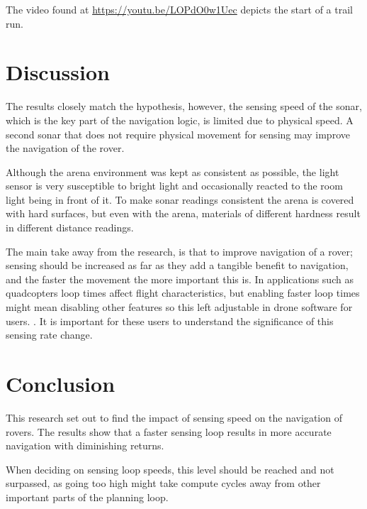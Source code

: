 \documentclass[a4paper,12pt,twocolumn]{report}
\begin{document}
The video found at \url{https://youtu.be/LOPdO0w1Uec} depicts the start of a trail run.

\section{Discussion}


The results closely match the hypothesis, however, the sensing speed of the sonar, which is the key part of the navigation logic, is limited due to physical speed. A second sonar that does not require physical movement for sensing may improve the navigation of the rover.

Although the arena environment was kept as consistent as possible, the light sensor is very susceptible to bright light and occasionally reacted to the room light being in front of it. To make sonar readings consistent the arena is covered with hard surfaces, but even with the arena, materials of different hardness result in different distance readings.

The main take away from the research, is that to improve navigation of a rover; sensing should be increased as far as they add a tangible benefit to navigation, and the faster the movement the more important this is. In applications such as quadcopters loop times affect flight characteristics, but enabling faster loop times might mean disabling other features so this left adjustable in drone software for users. \citep{betaflight}. It is important for these users to understand the significance of this sensing rate change.

\section{Conclusion}


This research set out to find the impact of sensing speed on the navigation of rovers. The results show that a faster sensing loop results in more accurate navigation with diminishing returns.

When deciding on sensing loop speeds, this level should be reached and not surpassed, as going too high might take compute cycles away from other important parts of the planning loop.


\end{document}
